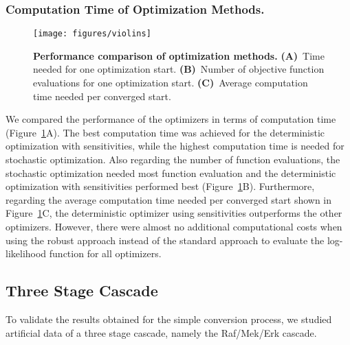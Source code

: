 \documentclass{llncs}
\begin{document}
\subsubsection{Computation Time of Optimization Methods.}
\begin{figure}[tb]
\centering
\texttt{[image: figures/violins]}
\caption{\textbf{Performance comparison of optimization methods.} \textbf{(A)}~Time needed for one optimization start. \textbf{(B)}~Number of objective function evaluations for one optimization start. \textbf{(C)}~Average computation time needed per converged start.} \label{fig:evals}
\end{figure}
We compared the performance of the optimizers in terms of computation time (Figure~\ref{fig:evals}A). The best computation time was achieved for the deterministic optimization with sensitivities, while the highest computation time is needed for stochastic optimization. Also regarding the number of function evaluations, the stochastic optimization needed most function evaluation and the deterministic optimization with sensitivities performed best (Figure~\ref{fig:evals}B). Furthermore, regarding the average computation time needed per converged start shown in Figure~\ref{fig:evals}C, the deterministic optimizer using sensitivities outperforms the other optimizers. However, there were almost no additional computational costs when using the robust approach instead of the standard approach to evaluate the log-likelihood function for all optimizers.  \color{revcol}
\subsection{Three Stage Cascade}
To validate the results obtained for the simple conversion process, we studied artificial data of a three stage cascade, namely the Raf/Mek/Erk cascade.
\end{document}
